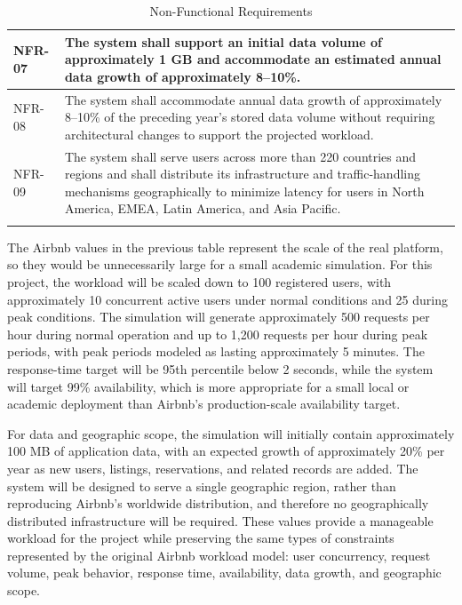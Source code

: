 \begin{longtable}{|p{}|p{}|}
    NFR-07 &
    The system shall support an initial data volume of approximately 1 GB and accommodate an estimated annual data growth 
    of approximately 8--10\%. \\
    \hline

    NFR-08 &
    The system shall accommodate annual data growth of approximately 8--10\% of the preceding year's stored data volume 
    without requiring architectural changes to support the projected workload. \\
    \hline

    NFR-09 &
    The system shall serve users across more than 220 countries and regions and shall distribute its infrastructure and 
    traffic-handling mechanisms geographically to minimize latency for users in North America, EMEA, Latin America, and 
    Asia Pacific. \\
    \hline

    \caption{Non-Functional Requirements}
    \label{tab:nfr}

\end{longtable}

The Airbnb values in the previous table represent the scale of the real platform, so they would be unnecessarily large 
for a small academic simulation. For this project, the workload will be scaled down to 100 registered users, with 
approximately 10 concurrent active users under normal conditions and 25 during peak conditions. The simulation will 
generate approximately 500 requests per hour during normal operation and up to 1,200 requests per hour during peak 
periods, with peak periods modeled as lasting approximately 5 minutes. The response-time target will be 95th percentile 
below 2 seconds, while the system will target 99\% availability, which is more appropriate for a small local or academic 
deployment than Airbnb's production-scale availability target.

For data and geographic scope, the simulation will initially contain approximately 100 MB of application data, with an 
expected growth of approximately 20\% per year as new users, listings, reservations, and related records are added. The 
system will be designed to serve a single geographic region, rather than reproducing Airbnb's worldwide distribution, and 
therefore no geographically distributed infrastructure will be required. These values provide a manageable workload for the 
project while preserving the same types of constraints represented by the original Airbnb workload model: user concurrency, 
request volume, peak behavior, response time, availability, data growth, and geographic scope.